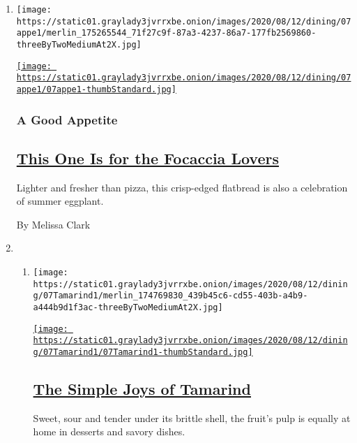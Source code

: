 \begin{enumerate}
\def\labelenumi{\arabic{enumi}.}
\item
  \texttt{[image: https://static01.graylady3jvrrxbe.onion/images/2020/08/12/dining/07appe1/merlin\_175265544\_71f27c9f-87a3-4237-86a7-177fb2569860-threeByTwoMediumAt2X.jpg]}

  \href{/2020/08/07/dining/eggplant-focaccia-recipe.html}{\texttt{[image: https://static01.graylady3jvrrxbe.onion/images/2020/08/12/dining/07appe1/07appe1-thumbStandard.jpg]}}

  \hypertarget{a-good-appetite}{%
  \subsubsection{A Good Appetite}\label{a-good-appetite}}

  \hypertarget{this-one-is-for-the-focaccia-lovers}{%
  \subsection{\texorpdfstring{\href{/2020/08/07/dining/eggplant-focaccia-recipe.html}{This
  One Is for the Focaccia
  Lovers}}{This One Is for the Focaccia Lovers}}\label{this-one-is-for-the-focaccia-lovers}}

  Lighter and fresher than pizza, this crisp-edged flatbread is also a
  celebration of summer eggplant.

  By Melissa Clark
\item
  \begin{enumerate}
  \def\labelenumii{\arabic{enumii}.}
  \item
    \texttt{[image: https://static01.graylady3jvrrxbe.onion/images/2020/08/12/dining/07Tamarind1/merlin\_174769830\_439b45c6-cd55-403b-a4b9-a444b9d1f3ac-threeByTwoMediumAt2X.jpg]}

    \href{/2020/08/07/dining/tamarind-recipes.html}{\texttt{[image: https://static01.graylady3jvrrxbe.onion/images/2020/08/12/dining/07Tamarind1/07Tamarind1-thumbStandard.jpg]}}

    \hypertarget{the-simple-joys-of-tamarind}{%
    \subsection{\texorpdfstring{\href{/2020/08/07/dining/tamarind-recipes.html}{The
    Simple Joys of
    Tamarind}}{The Simple Joys of Tamarind}}\label{the-simple-joys-of-tamarind}}

    Sweet, sour and tender under its brittle shell, the fruit's pulp is
    equally at home in desserts and savory dishes.


\end{enumerate}
\end{enumerate}
